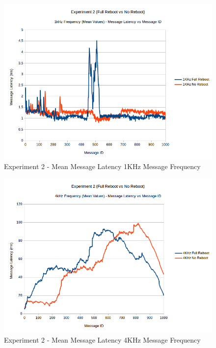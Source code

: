 \documentclass[../dissertation.tex]{subfiles}
\begin{document}
\begin{figure}[H]
\centering
\includegraphics[width=\textwidth]{images/experiment2/1khz-mean.png}
\caption{Experiment 2 - Mean Message Latency 1KHz Message Frequency}
\label{exp2-1khz-mean}
\end{figure}

\begin{figure}[H]
\centering
\includegraphics[width=\textwidth]{images/experiment2/4khz-mean.png}
\caption{Experiment 2 - Mean Message Latency 4KHz Message Frequency}
\label{exp2-4khz-mean}
\end{figure}
\end{document}

